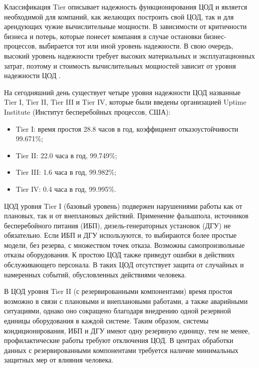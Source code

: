 Классификация Tier описывает надежность функционирования ЦОД и является необходимой для компаний, как желающих построить свой ЦОД, так и для арендующих чужие вычислительные мощности.
В зависимости от критичности бизнеса и потерь, которые понесет компания в случае остановки бизнес-процессов, выбирается тот или иной уровень надежности.
В свою очередь, высокий уровень надежности требует высоких материальных и эксплуатационных затрат, поэтому и стоимость вычислительных мощностей зависит от уровня надежности ЦОД \cite{dc-tier}.

На сегодняшний день существует четыре уровня надежности ЦОД названные Tier I, Tier II, Tier III и Tier IV, которые были введены организацией Uptime Institute (Институт бесперебойных процессов, США):
\begin{itemize}
  \item Tier I: время простоя 28.8 часов в год, коэффициент отказоустойчивости 99.671\%;
  \item Tier II: 22.0 часа в год, 99.749\%;
  \item Tier III: 1.6 часа в год, 99.982\%;
  \item Tier IV: 0.4 часа в год, 99.995\%.
\end{itemize}

ЦОД уровня Tier I (базовый уровень) подвержен нарушениями работы как от плановых, так и от внеплановых действий.
Применение фальшпола, источников бесперебойного питания (ИБП), дизель-генераторных установок (ДГУ) не обязательно.
Если ИБП и ДГУ используются, то выбираются более простые модели, без резерва, с множеством точек отказа.
Возможны самопроизвольные отказы оборудования.
К простою ЦОД также приведут ошибки в действиях обслуживающего персонала.
В таких ЦОД отсутствует защита от случайных и намеренных событий, обусловленных действиями человека.

В ЦОД уровня Tier II (с резервированными компонентами) время простоя возможно в связи с плановыми и внеплановыми работами, а также аварийными ситуациями, однако оно сокращено благодаря внедрению одной резервной единицы оборудования в каждой системе.
Таким образом, системы кондиционирования, ИБП и ДГУ имеют одну резервную единицу, тем не менее, профилактические работы требуют отключения ЦОД.
В центрах обработки данных с резервированными компонентами требуется наличие минимальных защитных мер от влияния человека.

